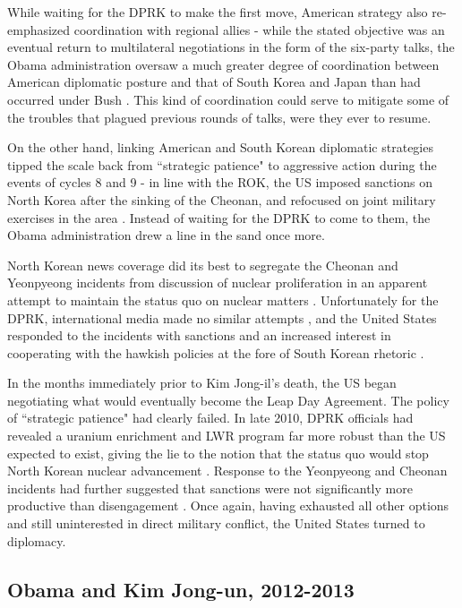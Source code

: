 \documentclass{article}
\begin{document}
While waiting for the DPRK to make the first move, American strategy also re-emphasized coordination with regional allies - while the stated objective was an eventual return to multilateral negotiations in the form of the six-party talks, the Obama administration oversaw a much greater degree of coordination between American diplomatic posture and that of South Korea and Japan than had occurred under Bush \cite{crs13,snyder2}. This kind of coordination could serve to mitigate some of the troubles that plagued previous rounds of talks, were they ever to resume.

On the other hand, linking American and South Korean diplomatic strategies tipped the scale back from ``strategic patience" to aggressive action during the events of cycles 8 and 9 - in line with the ROK, the US imposed sanctions on North Korea after the sinking of the Cheonan, and refocused on joint military exercises in the area \cite{starr}. Instead of waiting for the DPRK to come to them, the Obama administration drew a line in the sand once more.

North Korean news coverage did its best to segregate the Cheonan and Yeonpyeong incidents from discussion of nuclear proliferation in an apparent attempt to maintain the status quo on nuclear matters \cite{rich12}. Unfortunately for the DPRK, international media made no similar attempts \cite{beal}, and the United States responded to the incidents with sanctions and an increased interest in cooperating with the hawkish policies at the fore of South Korean rhetoric \cite{crs13}.

In the months immediately prior to Kim Jong-il's death, the US began negotiating what would eventually become the Leap Day Agreement. The policy of ``strategic patience" had clearly failed. In late 2010, DPRK officials had revealed a uranium enrichment and LWR program far more robust than the US expected to exist, giving the lie to the notion that the status quo would stop North Korean nuclear advancement \cite{snyder2}. Response to the Yeonpyeong and Cheonan incidents had further suggested that sanctions were not significantly more productive than disengagement \cite{delury}. Once again, having exhausted all other options and still uninterested in direct military conflict, the United States turned to diplomacy.

\subsection{Obama and Kim Jong-un, 2012-2013}
\end{document}
